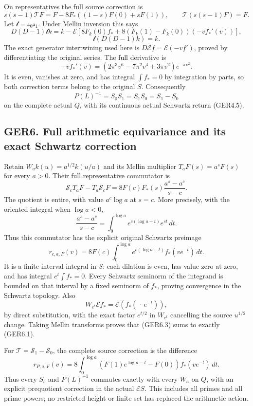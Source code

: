 On representatives the full source correction is \[
s(s-1)\mathscr TF=
F-8F_*((1-s)F(0)+sF(1)),\qquad
\mathscr T(s(s-1)F)=F.
\tag{GER5.4}
\] Let \(\mathscr t=\mathscr s_0\mathscr s_1\). Under Mellin inversion
this says \[
D(D-1)\mathscr tk
=k-\mathcal E\left[8F_k(0)f_*
+8(F_k(1)-F_k(0))(-vf_*'(v))\right],
\] \[
\mathscr t(D(D-1)k)=k.
\tag{GER5.5}
\] The exact generator intertwining used here is
\(D\mathcal Ef=\mathcal E(-vf')\), proved by differentiating the
original series. The full derivative is \[
-vf_*'(v)=(2\pi^3v^6-7\pi^2v^4+3\pi v^2)e^{-\pi v^2}.
\tag{GER5.6}
\] It is even, vanishes at zero, and has integral \(\int f_*=0\) by
integration by parts, so both correction terms belong to the original
\(S\). Consequently \[
\boxed{P(L)^{-1}=S_0S_1=S_1S_0=S_1-S_0}
\tag{GER5.7}
\] on the complete actual \(Q\), with its continuous actual Schwartz
return (GER4.5).

\subsection{GER6. Full arithmetic equivariance and its exact Schwartz
correction}\label{ger6.-full-arithmetic-equivariance-and-its-exact-schwartz-correction}

Retain \(W_ak(u)=a^{1/2}k(u/a)\) and its Mellin multiplier
\(T_aF(s)=a^sF(s)\) for every \(a>0\). Their full representative
commutator is \[
\mathscr S_cT_aF-T_a\mathscr S_cF
=8F(c)F_*(s)\frac{a^s-a^c}{s-c}.
\tag{GER6.1}
\] The quotient is entire, with value \(a^c\log a\) at \(s=c\). More
precisely, with the oriented integral when \(\log a<0\), \[
\frac{a^s-a^c}{s-c}
=\int_0^{\log a}e^{c(\log a-t)}e^{st}\,dt.
\tag{GER6.2}
\] Thus this commutator has the explicit original Schwartz preimage \[
r_{c,a,F}(v)=
8F(c)\int_0^{\log a}e^{c(\log a-t)}
f_*(ve^{-t})\,dt.
\tag{GER6.3}
\] It is a finite-interval integral in \(S\): each dilation is even, has
value zero at zero, and has integral \(e^t\int f_*=0\). Every Schwartz
seminorm of the integrand is bounded on that interval by a fixed
seminorm of \(f_*\), proving convergence in the Schwartz topology. Also
\[
W_{e^t}\mathcal Ef_*=\mathcal E(f_*(\,\cdot\,e^{-t})),
\] by direct substitution, with the exact factor \(e^{t/2}\) in
\(W_{e^t}\) cancelling the source \(u^{1/2}\) change. Taking Mellin
transforms proves that (GER6.3) sums to exactly (GER6.1).

For \(\mathscr T=\mathscr S_1-\mathscr S_0\), the complete source
correction is the difference \[
r_{P,a,F}(v)=
8\int_0^{\log a}
\left(F(1)e^{\log a-t}-F(0)\right)f_*(ve^{-t})\,dt.
\tag{GER6.4}
\] Thus every \(S_c\) and \(P(L)^{-1}\) commutes exactly with every
\(W_a\) on \(Q\), with an explicit prequotient correction in the actual
\(\mathcal ES\). This includes all primes and all prime powers; no
restricted height or finite set has replaced the arithmetic action.

